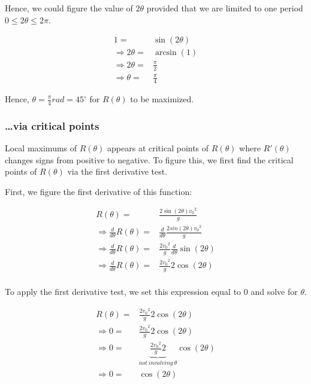 \documentclass[letterpaper]{article}
\begin{document}
Hence, we could figure the value of \(2\theta\) provided that we are limited to one period \(0\leq 2\theta \leq 2\pi\).

\begin{align}
    1 =& \sin(2\theta) \\
    \Rightarrow 2\theta =& \arcsin(1) \\
    \Rightarrow 2\theta =& \frac{\pi}{2} \\
    \Rightarrow \theta =& \frac{\pi}{4} 
\end{align}

Hence, \(\theta=\frac{\pi}{4}rad=45^{\circ}\) for \(R(\theta)\) to be maximized.

\subsubsection{\ldots{}via critical points}
\label{sec:org973fbd8}
Local maximums of \(R(\theta)\) appears at critical points of \(R(\theta)\) where \(R'(\theta)\) changes signs from positive to negative. To figure this, we first find the critical points of \(R(\theta)\) via the first derivative test.

First, we figure the first derivative of this function:

\begin{align}
    R(\theta) =& \frac{2\sin(2\theta){v_0}^2}{g} \\
    \Rightarrow \frac{d}{d\theta} R(\theta) =& \frac{d}{d\theta} \frac{2sin(2\theta){v_0}^2}{g} \\
    \Rightarrow \frac{d}{d\theta} R(\theta) =& \frac{2{v_0}^2}{g} \frac{d}{d\theta} \sin(2\theta) \\
    \Rightarrow \frac{d}{d\theta} R(\theta) =& \frac{2{v_0}^2}{g} 2\cos(2\theta) \\
\end{align}

To apply the first derivative test, we set this expression equal to \(0\) and solve for \(\theta\).

\begin{align}
    R(\theta) =& \frac{2{v_0}^2}{g} 2\cos(2\theta) \\
\Rightarrow 0 =& \frac{2{v_0}^2}{g} 2\cos(2\theta) \\
\Rightarrow 0 =& \underbrace{\frac{2{v_0}^2}{g}2}_{not\ involving\ \theta} \cos(2\theta) \\
\Rightarrow 0 =& \cos(2\theta) \\
\end{align}
\end{document}
